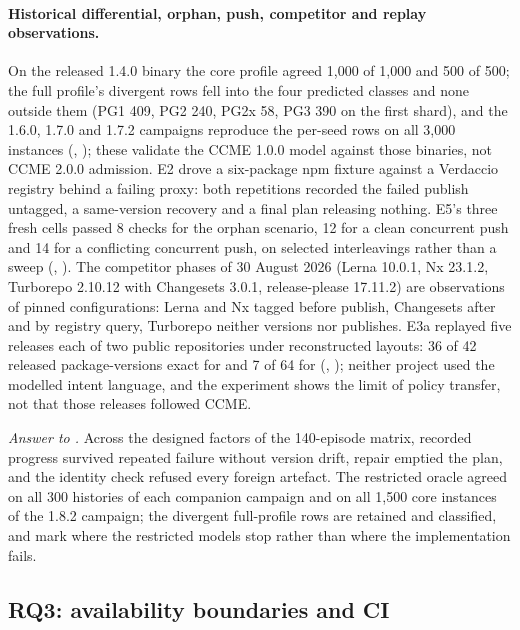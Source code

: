 \paragraph{Historical differential, orphan, push, competitor and replay
observations.} On the released 1.4.0 binary the core profile agreed 1,000 of
1,000 and 500 of 500; the full profile's divergent rows fell into the four
predicted classes and none outside them (PG1 409, PG2 240, PG2x 58, PG3 390
on the first shard), and the 1.6.0, 1.7.0 and 1.7.2 campaigns reproduce the
per-seed rows on all 3,000 instances (,
); these validate the CCME 1.0.0 model against those
binaries, not CCME 2.0.0 admission. E2 drove a six-package npm fixture against
a Verdaccio registry behind a failing proxy: both repetitions recorded the
failed publish untagged, a same-version recovery and a final plan releasing
nothing. E5's three fresh cells passed 8 checks for the orphan scenario, 12
for a clean concurrent push and 14 for a conflicting concurrent push, on
selected interleavings rather than a sweep (, ). The
competitor phases of 30 August 2026 (Lerna 10.0.1, Nx 23.1.2, Turborepo 2.10.12
with Changesets 3.0.1, release-please 17.11.2) are observations of pinned
configurations: Lerna and Nx tagged before publish, Changesets after and by
registry query, Turborepo neither versions nor publishes. E3a replayed five
releases each of two public repositories under reconstructed layouts: 36 of 42
released package-versions exact for  and 7 of 64 for
 (,
); neither project used the modelled intent language, and the
experiment shows the limit of policy transfer, not that those releases
followed CCME.

\emph{Answer to .} Across the designed factors of the 140-episode
matrix, recorded progress survived repeated failure without version drift,
repair emptied the plan, and the identity check refused every foreign
artefact. The restricted oracle agreed on all 300 histories of each companion
campaign and on all 1,500 core instances of the 1.8.2 campaign; the divergent
full-profile rows are retained and classified, and mark where the restricted
models stop rather than where the implementation fails.

\subsection{RQ3: availability boundaries and CI}
\label{sec:eval:rq3}

